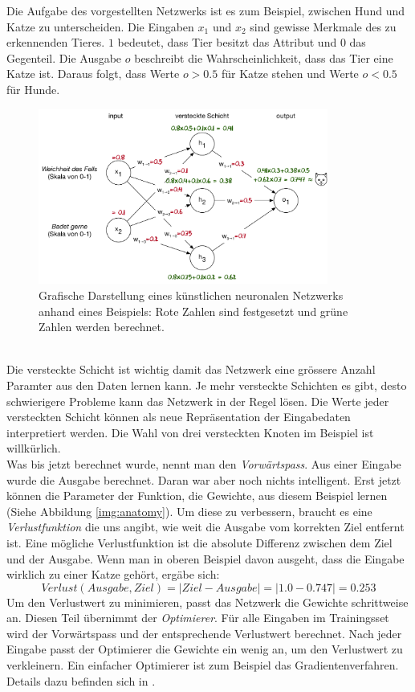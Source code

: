 Die Aufgabe des vorgestellten Netzwerks ist es zum Beispiel, zwischen Hund und Katze zu unterscheiden. Die Eingaben $x_1$ und $x_2$ sind gewisse Merkmale des zu erkennenden Tieres. $1$ bedeutet, dass Tier besitzt das Attribut und $0$ das Gegenteil. Die Ausgabe $o$ beschreibt die Wahrscheinlichkeit, dass das Tier eine Katze ist. Daraus folgt, dass Werte $o>0.5$ für Katze stehen und Werte $o<0.5$ für Hunde.
\begin{figure}[hbt]
	\centering
		\includegraphics[width=0.85\textwidth]{assets/neural_net.png}
	\caption{Grafische Darstellung eines künstlichen neuronalen Netzwerks anhand eines Beispiels: Rote Zahlen sind festgesetzt und grüne Zahlen werden berechnet.}
	\label{img:neuralnet}
\end{figure}
\\
Die versteckte Schicht ist wichtig damit das Netzwerk eine grössere Anzahl Paramter aus den Daten lernen kann. Je mehr versteckte Schichten es gibt, desto schwierigere Probleme kann das Netzwerk in der Regel lösen. Die Werte jeder versteckten Schicht können als neue Repräsentation der Eingabedaten interpretiert werden. Die Wahl von drei versteckten Knoten im Beispiel ist willkürlich.
\\
Was bis jetzt berechnet wurde, nennt man den \textit{Vorwärtspass}. Aus einer Eingabe wurde die Ausgabe berechnet. Daran war aber noch nichts intelligent. Erst jetzt können die Parameter der Funktion, die Gewichte, aus diesem Beispiel lernen (Siehe Abbildung \ref{img:anatomy}). Um diese zu verbessern, braucht es eine \textit{Verlustfunktion} die uns angibt, wie weit die Ausgabe vom korrekten Ziel entfernt ist. Eine mögliche Verlustfunktion ist die absolute Differenz zwischen dem Ziel und der Ausgabe. Wenn man in oberen Beispiel davon ausgeht, dass die Eingabe wirklich zu einer Katze gehört, ergäbe sich:
$$ Verlust(Ausgabe, Ziel) = |Ziel-Ausgabe| = |1.0-0.747| = 0.253$$
Um den Verlustwert zu minimieren, passt das Netzwerk die Gewichte schrittweise an. Diesen Teil übernimmt der  \textit{Optimierer}. Für alle Eingaben im Trainingsset wird der Vorwärtspass und der entsprechende Verlustwert berechnet. Nach jeder Eingabe passt der Optimierer die Gewichte ein wenig an, um den Verlustwert zu verkleinern. Ein einfacher Optimierer ist zum Beispiel das Gradientenverfahren. Details dazu befinden sich in \parencite{gradient}.

